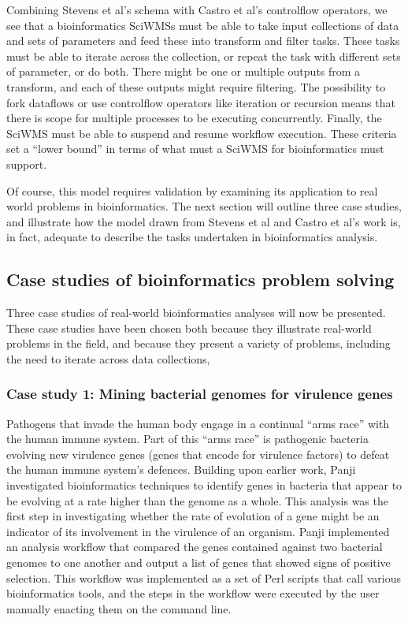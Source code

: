 \documentclass[a4paper,10pt]{scrreprt}
\begin{document}
Combining Stevens et al's schema with Castro et al's \gls{controlflow}
operators, we see that a bioinformatics \glspl{SciWMS} must be able to take
input collections of data and sets of parameters and feed these into transform
and filter tasks. These tasks must be able to iterate across the collection, or
repeat the task with different sets of parameter, or do both.
There might be one or multiple outputs from a transform, and each of these
outputs might require filtering. The possibility to fork \glspl{dataflow} or use
\gls{controlflow} operators like iteration or recursion means that there is
scope for multiple processes to be executing concurrently. Finally, the
\gls{SciWMS} must be able to suspend and resume workflow execution. These
criteria set a ``lower bound'' in terms of what must a \gls{SciWMS} for
bioinformatics must support.

Of course, this model requires validation by examining its application to real
world problems in bioinformatics. The next section will outline three case
studies, and illustrate how the model drawn from Stevens et al
\cite{stevens_classification_2001} and Castro et al's
\cite{castro_workflows_2005} work is, in fact, adequate to describe the tasks
undertaken in bioinformatics analysis.

\subsection{Case studies of bioinformatics problem solving}
\label{sec:case_studies}

Three case studies of real-world bioinformatics analyses will now be presented.
These case studies have been chosen both because they illustrate real-world problems in the field,
and because they present a variety of problems, including the need to iterate across data collections,



\subsubsection{Case study 1: Mining bacterial genomes for virulence genes}

Pathogens that invade the human body engage in a continual ``arms race'' with the human immune system. Part of this ``arms race'' is pathogenic bacteria evolving new virulence genes (genes that encode for virulence factors) to defeat the human immune system's defences. Building upon earlier work, Panji \cite{panji_identification_2009} investigated bioinformatics techniques to identify genes in bacteria that appear to be evolving at a rate higher than the genome as a whole. This analysis was the first step in investigating whether the rate of evolution of a gene might be an indicator of its involvement in the virulence of an organism. Panji implemented an analysis workflow that compared the genes contained against two bacterial genomes to one another and output a list of genes that showed signs of positive selection. This workflow was implemented as a set of Perl scripts that call various bioinformatics tools, and the steps in the workflow were executed by the user manually enacting them on the command line.
\end{document}
